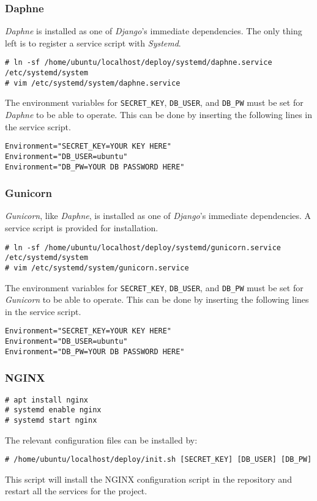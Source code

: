 \subsubsection{Daphne}

\emph{Daphne} is installed as one of \emph{Django}'s immediate dependencies.
The only thing
left is to register a service script with \emph{Systemd}.
\begin{lstlisting}
# ln -sf /home/ubuntu/localhost/deploy/systemd/daphne.service /etc/systemd/system
# vim /etc/systemd/system/daphne.service
\end{lstlisting}
The environment variables for \lstinline{SECRET_KEY}, \lstinline{DB_USER}, and \lstinline{DB_PW} must be set for \emph{Daphne} to be able to operate. This can be done by inserting the following lines in the service script.
\begin{lstlisting}
Environment="SECRET_KEY=YOUR KEY HERE"
Environment="DB_USER=ubuntu"
Environment="DB_PW=YOUR DB PASSWORD HERE"
\end{lstlisting}


\subsubsection{Gunicorn}

\emph{Gunicorn}, like \emph{Daphne}, is installed as one of \emph{Django}'s immediate dependencies. A service script is provided for installation.

\begin{lstlisting}
# ln -sf /home/ubuntu/localhost/deploy/systemd/gunicorn.service /etc/systemd/system
# vim /etc/systemd/system/gunicorn.service
\end{lstlisting}
The environment variables for \lstinline{SECRET_KEY}, \lstinline{DB_USER}, and \lstinline{DB_PW} must be set for \emph{Gunicorn} to be able to operate. This can be done by inserting the following lines in the service script.
\begin{lstlisting}
Environment="SECRET_KEY=YOUR KEY HERE"
Environment="DB_USER=ubuntu"
Environment="DB_PW=YOUR DB PASSWORD HERE"
\end{lstlisting}

\subsubsection{NGINX}

\begin{lstlisting}
# apt install nginx
# systemd enable nginx
# systemd start nginx
\end{lstlisting}
The relevant configuration files can be installed by:
\begin{lstlisting}
# /home/ubuntu/localhost/deploy/init.sh [SECRET_KEY] [DB_USER] [DB_PW]
\end{lstlisting}
This script will install the NGINX configuration script in the repository and restart all the services for the project.
